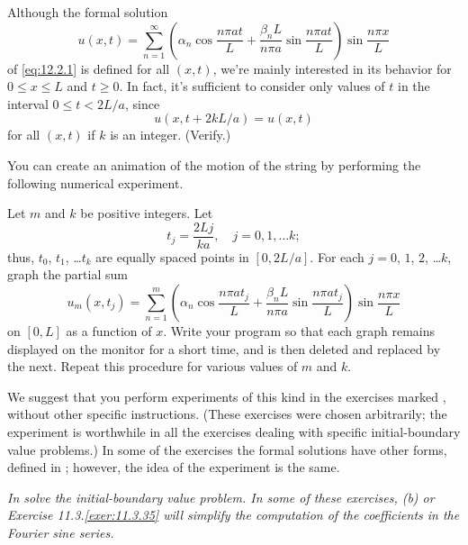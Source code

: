 Although the formal solution
\[
u(x,t)=\sum_{n=1}^\infty\left(\alpha_n\cos\frac{n\pi at}{L}+\frac{\beta_nL}{n\pi a}\sin\frac{n\pi at}{L}\right)
\sin\frac{n\pi x}{L}
\]
of \eqref{eq:12.2.1} is defined for all $(x,t)$, we're mainly interested
in its behavior for $0\le x\le L$ and $t\ge0$. In fact, it's
sufficient to consider only values of $t$ in the interval $0\le
t<2L/a$, since
\[
u(x,t+2kL/a)=u(x,t)
\]
for all $(x,t)$  if $k$ is an integer. (Verify.)

You can create an animation of the motion of the string
by performing the following numerical experiment.

Let $m$  and $k$ be positive integers. Let
\[
t_j=\frac{2Lj}{ka},\quad j=0,1,\dots k;
\]
thus, $t_0$, $t_1$, \dots $t_k$ are equally spaced points in $[0,2L/a]$.
For each $j=0$, $1$, $2$, \dots $k$, graph the partial sum
\[
u_m(x,t_j)=\sum_{n=1}^m\left(\alpha_n\cos\frac{n\pi at_j}{L}+\frac{\beta_nL}{n\pi a}\sin\frac{n\pi at_j}{L}\right)
\sin\frac{n\pi x}{L}
\]
on $[0,L]$ as a function of $x$.  Write your program so that
each graph remains displayed on the monitor for a short time,
and is then deleted and replaced by the next. Repeat this
procedure for various values of $m$ and $k$.

We suggest that you perform experiments of this kind in the exercises
marked \Cex\hspace*{-3pt}, without other specific instructions. (These
exercises
were chosen arbitrarily;   the experiment is worthwhile in all the
exercises dealing with specific initial-boundary value problems.) In
some of the exercises the formal solutions have other forms, defined
in ;     however,
the idea of the experiment is the same.


\exercises

\noindent
\emph{In  solve the
initial-boundary value problem.
In some of these exercises, (b)
or {Exercise 11.3.\ref{exer:11.3.35}} will
simplify the computation of the coefficients in the Fourier sine series.}

